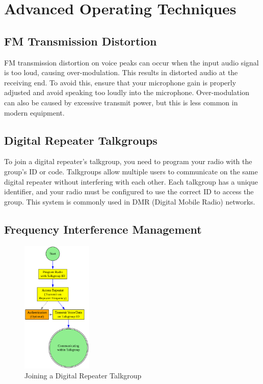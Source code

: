 \section{Advanced Operating Techniques}
\label{section:advanced_operating}

\subsection*{FM Transmission Distortion}
FM transmission distortion on voice peaks can occur when the input audio signal is too loud, causing over-modulation. This results in distorted audio at the receiving end. To avoid this, ensure that your microphone gain is properly adjusted and avoid speaking too loudly into the microphone. Over-modulation can also be caused by excessive transmit power, but this is less common in modern equipment.


\subsection*{Digital Repeater Talkgroups}
To join a digital repeater's talkgroup, you need to program your radio with the group's ID or code. Talkgroups allow multiple users to communicate on the same digital repeater without interfering with each other. Each talkgroup has a unique identifier, and your radio must be configured to use the correct ID to access the group. This system is commonly used in DMR (Digital Mobile Radio) networks.

\subsection*{Frequency Interference Management}
\begin{figure}
    \centering
    \includegraphics[width=0.3\textwidth]{tech/organized/chapter_2/images/talkgroup.png}
    \caption{Joining a Digital Repeater Talkgroup}
    \label{fig:talkgroup}
\end{figure}

